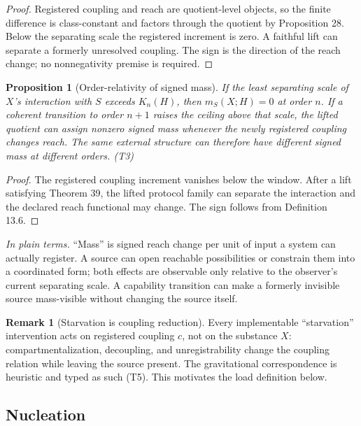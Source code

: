 \documentclass[11pt]{article}
\newtheorem{proposition}{Proposition}
\theoremstyle{definition}
\newtheorem{remark}{Remark}
\newcommand{\plainterms}{\emph{In plain terms.}}
\begin{document}
\begin{proof}
Registered coupling and reach are quotient-level objects, so the finite difference is class-constant and factors through the quotient by Proposition 28. Below the separating scale the registered increment is zero. A faithful lift can separate a formerly unresolved coupling. The sign is the direction of the reach change; no nonnegativity premise is required.
\end{proof}

\begin{proposition}[Order-relativity of signed mass]
If the least separating scale of $X$'s interaction with $S$ exceeds $K_n(H)$, then $m_S(X; H) = 0$ at order $n$. If a coherent transition to order $n+1$ raises the ceiling above that scale, the lifted quotient can assign nonzero signed mass whenever the newly registered coupling changes reach. The same external structure can therefore have different signed mass at different orders. (T3)
\end{proposition}

\begin{proof}
The registered coupling increment vanishes below the window. After a lift satisfying Theorem 39, the lifted protocol family can separate the interaction and the declared reach functional may change. The sign follows from Definition 13.6.
\end{proof}

\noindent\plainterms{} ``Mass'' is signed reach change per unit of input a system can actually register. A source can open reachable possibilities or constrain them into a coordinated form; both effects are observable only relative to the observer's current separating scale. A capability transition can make a formerly invisible source mass-visible without changing the source itself.

\begin{remark}[Starvation is coupling reduction]
Every implementable ``starvation'' intervention acts on registered coupling $c$, not on the substance $X$: compartmentalization, decoupling, and unregistrability change the coupling relation while leaving the source present. The gravitational correspondence is heuristic and typed as such (T5). This motivates the load definition below.
\end{remark}

\subsection{Nucleation}
\end{document}
